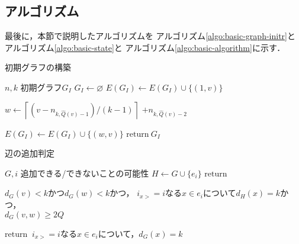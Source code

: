 \subsection{アルゴリズム}
\label{subsect:basic-algorithm}
最後に，本節で説明したアルゴリズムを
アルゴリズム\ref{algo:basic-graph-initr}と
アルゴリズム\ref{algo:basic-state}と
アルゴリズム\ref{algo:basic-algorithm}に示す．
\begin{algorithm}
  \caption{初期グラフの構築}
  \label{algo:basic-graph-initr}
  \begin{algorithmic}[1]
    \Require $n,k$
    \Ensure 初期グラフ$G_I$
    \State $G_I\gets \varnothing$
    \State $E(G_I)\gets E(G_I)\cup\{(1,v)\}$
    \EndFor
    \State \parbox[t]{.6\linewidth}{
      $w\gets \left\lceil(v-n_{k,\hat{Q}(v)-1})/(k-1)\right\rceil$
      $+n_{k,\hat{Q}(v)-2}$
    }
    \State $E(G_I)\gets E(G_I)\cup\{(w,v)\}$
    \EndFor
    \State $\mathrm{return}\:G_I$
    \EndProcedure
  \end{algorithmic}
\end{algorithm}

\begin{algorithm}
  \caption{辺の追加判定}
  \label{algo:basic-state}
  \begin{algorithmic}[1]
    \Require $G,i$
    \Ensure 追加できる/できないことの可能性
    \State $H\gets G\cup\{e_i\}$
    \State $\mathrm{return\:}$\parbox[t]{\linewidth}{
      $d_G(v)<k$かつ$d_G(w)<k$かつ，
      $i_{x>}=i$なる$x\in e_i$について$d_H(x)=k$かつ， \\
      $d_G(v,w)\geq2Q$
    }
    \EndProcedure
    \State $\mathrm{return}\:$ $i_{x>}=i$なる$x\in e_i$について，$d_G(x)=k$
    \EndProcedure
  \end{algorithmic}
\end{algorithm}

